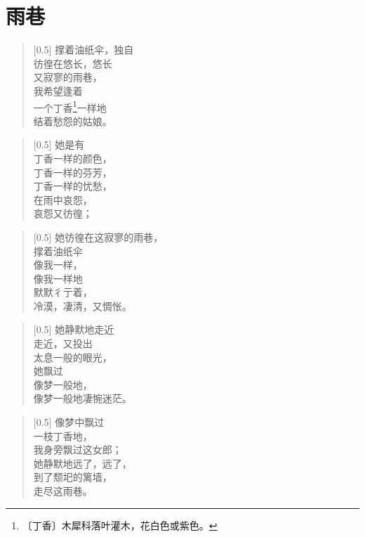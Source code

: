 \documentclass[12pt,UTF-8,openany]{ctexbook}
\begin{document}
\chapter{雨巷}

\begin{large}
    
    \begin{verse}[0.5\linewidth]
        撑着油纸伞，独自 \\
        彷徨在悠长，悠长 \\
        又寂寥的雨巷， \\
        我希望逢着 \\
        一个丁香\footnote{〔丁香〕木犀科落叶灌木，花白色或紫色。}一样地 \\
        结着愁怨的姑娘。
    \end{verse}
    
    
    \begin{verse}[0.5\linewidth]
        她是有 \\
        丁香一样的颜色， \\
        丁香一样的芬芳， \\
        丁香一样的忧愁， \\
        在雨中哀怨， \\
        哀怨又彷徨；
    \end{verse}
    
    
    \begin{verse}[0.5\linewidth]
        她彷徨在这寂寥的雨巷， \\
        撑着油纸伞 \\
        像我一样， \\
        像我一样地 \\
        默默彳亍着， \\
        冷漠，凄清，又惆怅。
    \end{verse}
    
    
    \begin{verse}[0.5\linewidth]
        她静默地走近 \\
        走近，又投出 \\
        太息一般的眼光， \\
        她飘过 \\
        像梦一般地， \\
        像梦一般地凄惋迷茫。
    \end{verse}
    
    
    \begin{verse}[0.5\linewidth]
        像梦中飘过 \\
        一枝丁香地， \\
        我身旁飘过这女郎； \\
        她静默地远了，远了， \\
        到了颓圯的篱墙， \\
        走尽这雨巷。
    \end{verse}
    

\end{large}
\end{document}
